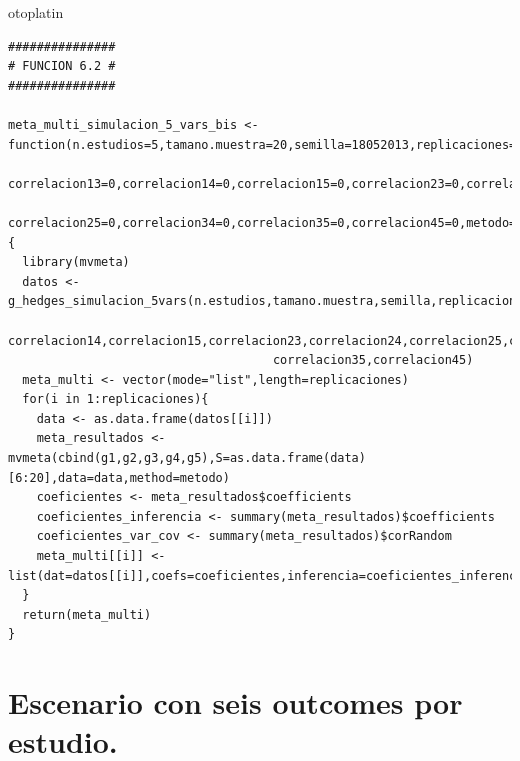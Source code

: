 otoplatin\documentclass[a4paper,openright,12pt]{report}
\begin{document}
{\begin{verbatim}
###############
# FUNCION 6.2 #
###############

meta_multi_simulacion_5_vars_bis <- function(n.estudios=5,tamano.muestra=20,semilla=18052013,replicaciones=5,correlacion12=0,
                                             correlacion13=0,correlacion14=0,correlacion15=0,correlacion23=0,correlacion24=0,
                                             correlacion25=0,correlacion34=0,correlacion35=0,correlacion45=0,metodo="reml"){
  library(mvmeta)
  datos <- g_hedges_simulacion_5vars(n.estudios,tamano.muestra,semilla,replicaciones,correlacion12,correlacion13,
                                     correlacion14,correlacion15,correlacion23,correlacion24,correlacion25,correlacion34,
                                     correlacion35,correlacion45)
  meta_multi <- vector(mode="list",length=replicaciones)
  for(i in 1:replicaciones){
    data <- as.data.frame(datos[[i]])
    meta_resultados <- mvmeta(cbind(g1,g2,g3,g4,g5),S=as.data.frame(data)[6:20],data=data,method=metodo)
    coeficientes <- meta_resultados$coefficients
    coeficientes_inferencia <- summary(meta_resultados)$coefficients
    coeficientes_var_cov <- summary(meta_resultados)$corRandom
    meta_multi[[i]] <- list(dat=datos[[i]],coefs=coeficientes,inferencia=coeficientes_inferencia,var_cov=coeficientes_var_cov)
  }
  return(meta_multi)  
}
\end{verbatim}}

\section{Escenario con seis outcomes por estudio.}
\end{document}

